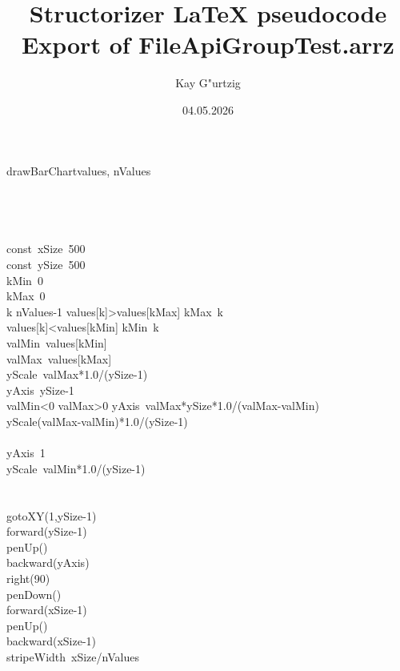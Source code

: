 \documentclass[a4paper,10pt]{article}
\title{Structorizer LaTeX pseudocode Export of FileApiGroupTest.arrz}
\author{Kay G"urtzig}
\date{04.05.2026}
\begin{document}
\begin{pseudocode}{drawBarChart}{values, nValues }
\label{drawBarChart}
\\
\\
\\
\\
  \\
  const\ xSize\gets\ 500\\
  const\ ySize\gets\ 500\\
  kMin\gets\ 0\\
  kMax\gets\ 0\\
  \FOR k  \TO nValues-1  \DO
    \IF values[k]>values[kMax] \THEN
      kMax\gets\ k\\
    \ELSE
      \IF values[k]<values[kMin] \THEN
        kMin\gets\ k\\
  valMin\gets\ values[kMin]\\
  valMax\gets\ values[kMax]\\
  yScale\gets\ valMax*1.0/(ySize-1)\\
  yAxis\gets\ ySize-1\\
  \IF valMin<0 \THEN
    \IF valMax>0 \THEN
    \BEGIN
      yAxis\gets\ valMax*ySize*1.0/(valMax-valMin)\\
      yScale\gets(valMax-valMin)*1.0/(ySize-1)\\
    \END\\
    \ELSE
    \BEGIN
      yAxis\gets\ 1\\
      yScale\gets\ valMin*1.0/(ySize-1)\\
    \END\\
  \\
  gotoXY(1,ySize-1)\\
  forward(ySize-1)\\
  penUp()\\
  backward(yAxis)\\
  right(90)\\
  penDown()\\
  forward(xSize-1)\\
  penUp()\\
  backward(xSize-1)\\
  stripeWidth\gets\ xSize/nValues\\

\end{pseudocode}
\end{document}
